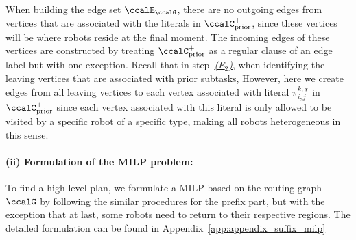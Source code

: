 \documentclass[Afour,sageh,times]{sagej}
\newcounter{mycounter}
\renewcommand{\ap}[3]{\mathcal{\pi}_{{#1},{#2}}^{#3}}
\begin{document}
{{  When  building the edge set $\ccalE_\ccalG$, there are no outgoing edges from  vertices that are associated with the literals in $\ccalC_{\text{prior}}^+$, since these vertices will be where robots reside at the final moment. The incoming edges of these vertices are constructed by treating $\ccalC_{\text{prior}}^+$ as a regular clause  of an edge label but with one exception.  Recall that in step~\hyperref[sec:a]{\it {(E$_2$)}}, when identifying the leaving vertices that are associated with prior subtasks,  However, here we create edges from all leaving vertices to each vertex associated with literal $\ap{i}{j}{k,\chi}$ in $\ccalC_{\text{prior}}^+$ since each vertex associated with this literal  is only allowed to be visited by a specific robot of a specific type, making all robots heterogeneous in this sense.
\paragraph{(ii) Formulation of the MILP problem:}  To find a high-level plan, we formulate a MILP  based on the routing graph $\ccalG$
by following the similar procedures for the prefix part, but with the exception that at last, some robots need to return to their respective regions. The detailed formulation can be found in Appendix~\ref{app:appendix_suffix_milp}
}}
\end{document}
